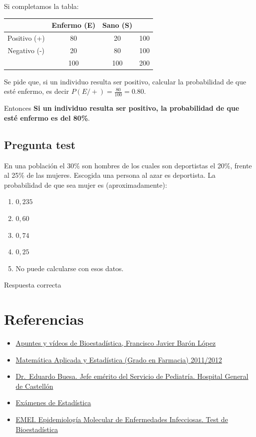 \documentclass[
]{book}
\providecommand{\tightlist}{%
  \setlength{\itemsep}{0pt}\setlength{\parskip}{0pt}}
\begin{document}
Si completamos la tabla:

\begin{longtable}[]{@{}cccc@{}}
\toprule
& Enfermo (E) & Sano (S) &\tabularnewline
\midrule
\endhead
Positivo (+) & 80 & 20 & 100\tabularnewline
Negativo (-) & 20 & 80 & 100\tabularnewline
& 100 & 100 & 200\tabularnewline
\bottomrule
\end{longtable}

Se pide que, si un individuo resulta ser positivo, calcular la probabilidad de que esté enfermo, es decir \(P(E/+)= \frac{80}{100}=0.80\).

Entonces \textbf{Si un individuo resulta ser positivo, la probabilidad de que esté enfermo es del 80\%}.

\hypertarget{pregunta-test-177}{%
\section{Pregunta test}\label{pregunta-test-177}}

En una población el 30\% son hombres de los cuales son deportistas el 20\%, frente al 25\% de las mujeres. Escogida una persona al azar es deportista. La probabilidad de que sea mujer es (aproximadamente):

\begin{enumerate}
\def\labelenumi{\alph{enumi})}
\tightlist
\item
  \(0,235\)
\item
  \(0,60\)
\item
  \(0,74\)
\item
  \(0,25\)
\item
  No puede calcularse con esos datos.
\end{enumerate}

Respuesta correcta

\hypertarget{referencias}{%
\chapter{Referencias}\label{referencias}}

\begin{itemize}
\item
  \href{https://www.bioestadistica.uma.es/baron/apuntes/}{Apuntes y vídeos de Bioestadística, Francisco Javier Barón López}
\item
  \href{https://personal.us.es/pmr/index.php/docencia/cursos-anteriores/88-2011-2012/94-matematica-aplicada-y-estadistica-grado-en-farmacia-2011-2012}{Matemática Aplicada y Estadística (Grado en Farmacia) 2011/2012}
\item
  \href{http://eduardobuesa.es}{Dr.~Eduardo Buesa. Jefe emérito del Servicio de Pediatría. Hospital General de Castellón}
\item
  \href{https://aprendeconalf.es/docencia/estadistica/examenes/}{Exámenes de Estadística}
\item
  \href{https://epidemiologiamolecular.com/investigacion-epidemiologica/test-de-bioestadistica/}{EMEI. Epidemiología Molecular de Enfermedades Infecciosas. Test de Bioestadística}
\end{itemize}

  
\end{document}
